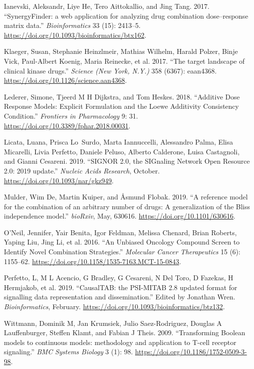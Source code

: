 \documentclass[
  12pt,
]{book}
\newlength{\cslhangindent}
\newenvironment{cslreferences}%
  {\setlength{\parindent}{0pt}%
  \everypar{\setlength{\hangindent}{\cslhangindent}}\ignorespaces}%
  {\par}
\begin{document}
\begin{cslreferences}
\leavevmode\hypertarget{ref-Ianevski2017}{}%
Ianevski, Aleksandr, Liye He, Tero Aittokallio, and Jing Tang. 2017. ``SynergyFinder: a web application for analyzing drug combination dose--response matrix data.'' \emph{Bioinformatics} 33 (15): 2413--5. \url{https://doi.org/10.1093/bioinformatics/btx162}.

\leavevmode\hypertarget{ref-Klaeger2017}{}%
Klaeger, Susan, Stephanie Heinzlmeir, Mathias Wilhelm, Harald Polzer, Binje Vick, Paul-Albert Koenig, Maria Reinecke, et al. 2017. ``The target landscape of clinical kinase drugs.'' \emph{Science (New York, N.Y.)} 358 (6367): eaan4368. \url{https://doi.org/10.1126/science.aan4368}.

\leavevmode\hypertarget{ref-Lederer2018}{}%
Lederer, Simone, Tjeerd M H Dijkstra, and Tom Heskes. 2018. ``Additive Dose Response Models: Explicit Formulation and the Loewe Additivity Consistency Condition.'' \emph{Frontiers in Pharmacology} 9: 31. \url{https://doi.org/10.3389/fphar.2018.00031}.

\leavevmode\hypertarget{ref-Licata2019}{}%
Licata, Luana, Prisca Lo~Surdo, Marta Iannuccelli, Alessandro Palma, Elisa Micarelli, Livia Perfetto, Daniele Peluso, Alberto Calderone, Luisa Castagnoli, and Gianni Cesareni. 2019. ``SIGNOR 2.0, the SIGnaling Network Open Resource 2.0: 2019 update.'' \emph{Nucleic Acids Research}, October. \url{https://doi.org/10.1093/nar/gkz949}.

\leavevmode\hypertarget{ref-Mulder2019}{}%
Mulder, Wim De, Martin Kuiper, and Åsmund Flobak. 2019. ``A reference model for the combination of an arbitrary number of drugs: A generalization of the Bliss independence model.'' \emph{bioRxiv}, May, 630616. \url{https://doi.org/10.1101/630616}.

\leavevmode\hypertarget{ref-ONeil2016}{}%
O'Neil, Jennifer, Yair Benita, Igor Feldman, Melissa Chenard, Brian Roberts, Yaping Liu, Jing Li, et al. 2016. ``An Unbiased Oncology Compound Screen to Identify Novel Combination Strategies.'' \emph{Molecular Cancer Therapeutics} 15 (6): 1155--62. \url{https://doi.org/10.1158/1535-7163.MCT-15-0843}.

\leavevmode\hypertarget{ref-Perfetto2019}{}%
Perfetto, L, M L Acencio, G Bradley, G Cesareni, N Del Toro, D Fazekas, H Hermjakob, et al. 2019. ``CausalTAB: the PSI-MITAB 2.8 updated format for signalling data representation and dissemination.'' Edited by Jonathan Wren. \emph{Bioinformatics}, February. \url{https://doi.org/10.1093/bioinformatics/btz132}.

\leavevmode\hypertarget{ref-Wittmann2009}{}%
Wittmann, Dominik M, Jan Krumsiek, Julio Saez-Rodriguez, Douglas A Lauffenburger, Steffen Klamt, and Fabian J Theis. 2009. ``Transforming Boolean models to continuous models: methodology and application to T-cell receptor signaling.'' \emph{BMC Systems Biology} 3 (1): 98. \url{https://doi.org/10.1186/1752-0509-3-98}.


\end{cslreferences}
\end{document}
